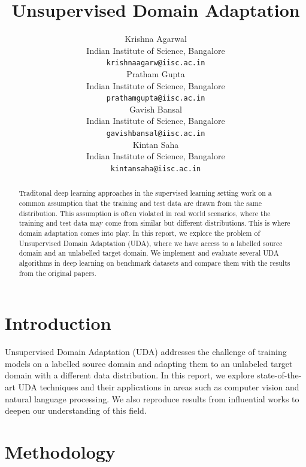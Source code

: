 \documentclass{article}
\title{Unsupervised Domain Adaptation}
\author{ Krishna Agarwal\\%
  Indian Institute of Science, Bangalore\\
  \texttt{krishnaagarw@iisc.ac.in} \\
   \And
  {Pratham Gupta} \\
  Indian Institute of Science, Bangalore\\
  \texttt{prathamgupta@iisc.ac.in} \\
   \And
   {Gavish Bansal} \\
   Indian Institute of Science, Bangalore\\
   \texttt{gavishbansal@iisc.ac.in} \\
   \And
   {Kintan Saha} \\
   Indian Institute of Science, Bangalore\\
   \texttt{kintansaha@iisc.ac.in} \\
}
\begin{document}
\graphicspath{{./images/}}

\maketitle


\begin{abstract}
  Traditonal deep learning approaches in the supervised learning setting work on a common assumption that the training and test data are drawn from the same distribution. This assumption is often violated in real world scenarios, where the training and test data may come from similar but different distributions. This is where domain adaptation comes into play. In this report, we explore the problem of Unsupervised Domain Adaptation (UDA), where we have access to a labelled source domain and an unlabelled target domain. We implement and evaluate several UDA algorithms in deep learning on benchmark datasets and compare them with the results from the original papers.
\end{abstract}


\section{Introduction}
Unsupervised Domain Adaptation (UDA) addresses the challenge of training models on a labelled source domain and adapting them to an unlabeled target domain with a different data distribution. In this report, we explore state-of-the-art UDA techniques and their applications in areas such as computer vision and natural language processing. We also reproduce results from influential works \cite{ganin2016domainadversarialtrainingneuralnetworks,survey,Ben-David2010} to deepen our understanding of this field.

\section{Methodology}
\end{document}
